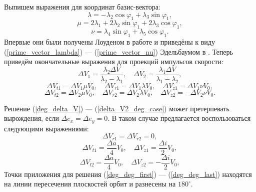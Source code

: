 \documentclass[12pt,a4paper]{extarticle}
\begin{document}
Выпишем выражения для координат базис-вектора:
\begin{equation}
    \lambda = - \lambda_2 \cos \varphi_1 + \lambda_3 \sin \varphi_1,
\label{prime_vector_lambda}
\end{equation}
\begin{equation}
    \mu = 2 \lambda_1 + 2 \lambda_2 \sin \varphi_1 + 2 \lambda_3 \cos \varphi_1,
\end{equation}
\begin{equation}
    \nu = \lambda_4 \sin \varphi_1 + \lambda_5 \cos \varphi_1.
\label{prime_vector_nu}
\end{equation}
Впервые они были получены Лоуденом в работе \cite{Lawden_all} и приведёны к виду (\ref{prime_vector_lambda}) --- (\ref{prime_vector_nu}) Эдельбаумом в \cite{Edelbaum_1}. Теперь приведём окончательные выражения для проекций импульсов скорости:
\begin{equation}
    \Delta V_1 = \frac{\lambda_2 \Delta V}{\lambda_2 - \lambda_1}, \quad \Delta V_2 = \frac{\lambda_1 \Delta V}{\lambda_1 - \lambda_2},
\end{equation}
\begin{equation}
    \Delta V_{t1} = \Delta V_1 \mu V_0, \quad \Delta V_{r1} = \Delta V_1 \lambda V_0, \quad \Delta V_{z1} = \Delta V_1 \nu V_0,
\end{equation}
\begin{equation}
    \Delta V_{t2} = \Delta V_2 \mu V_0, \quad \Delta V_{r2} = \Delta V_2 \lambda V_0, \quad \Delta V_{z2} = -\Delta V_2 \nu V_0.
\label{delta_V2_deg_case}
\end{equation}

Решение (\ref{deg_delta_V}) --- (\ref{delta_V2_deg_case}) может претерпевать вырождения, если $\Delta e_x = \Delta e_y = 0$. В таком случае предлагается воспользоваться следующими выражениями:
\begin{equation}
    \Delta V_{r1} = \Delta V_{r2} = 0,
\label{deg_deg_first}
\end{equation}
\begin{equation}
    \Delta V_{t1} = \frac{\Delta a}{4} V_0, \quad \Delta V_{z1} = \frac{\Delta i}{2} V_0,
\end{equation}
\begin{equation}
    \Delta V_{t2} = \frac{\Delta a}{4} V_0, \quad \Delta V_{z2} = - \frac{\Delta i}{2} V_0,
\label{deg_deg_last}
\end{equation}
Точки приложения для решения (\ref{deg_deg_first}) --- (\ref{deg_deg_last}) находятся на линии пересечения плоскостей орбит и разнесены на $180^{\circ}$.
\end{document}
